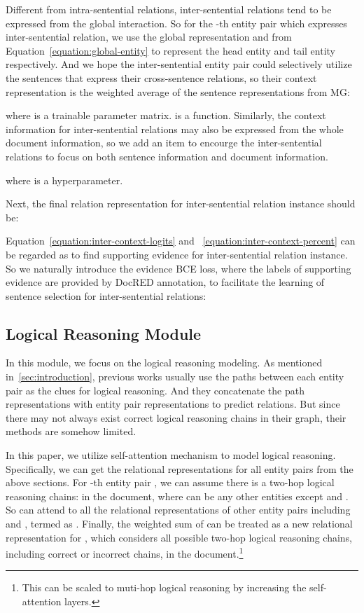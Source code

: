 \documentclass[11pt,a4paper]{article}
\begin{document}
Different from intra-sentential relations, inter-sentential relations tend to be expressed from the global interaction. So for the -th entity pair  which expresses inter-sentential relation, we use the global representation  and  from Equation~\ref{equation:global-entity} to represent the head entity and tail entity respectively. And we hope the inter-sentential entity pair could selectively utilize the sentences that express their cross-sentence relations, so their context representation is the weighted average of the sentence representations from MG:



where  is a trainable parameter matrix.  is a  function. 
Similarly, the context information for inter-sentential relations may also be expressed from the whole document information, so we add an item to encourge the inter-sentential relations to focus on both sentence information and document information.

where  is a hyperparameter.

Next, the final relation representation for inter-sentential relation instance  should be:


Equation~\ref{equation:inter-context-logits} and ~\ref{equation:inter-context-percent} can be regarded as to find supporting evidence for inter-sentential relation instance. So we naturally introduce the evidence BCE loss, where the labels of supporting evidence are provided by DocRED annotation, to facilitate the learning of sentence selection for inter-sentential relations:


\subsection{Logical Reasoning Module\label{ssec:reasoning}}
In this module, we focus on the logical reasoning modeling. As mentioned in~\ref{sec:introduction}, previous works usually use the paths between each entity pair as the clues for logical reasoning. And they concatenate the path representations with entity pair representations to predict relations. But since there may not always exist correct logical reasoning chains in their graph, their methods are somehow limited.

In this paper, we utilize self-attention mechanism \citep{transformer} to model logical reasoning. Specifically, we can get the relational representations for all entity pairs from the above sections. For -th entity pair , we can assume there is a two-hop logical reasoning chains:  in the document, where  can be any other entities except  and . So  can attend to all the relational representations of other entity pairs including  and , termed as . Finally, the weighted sum of  can be treated as a new relational representation for , which considers all possible two-hop logical reasoning chains, including correct or incorrect chains, in the document.\footnote{This can be scaled to muti-hop logical reasoning by increasing the self-attention layers.}
\end{document}
